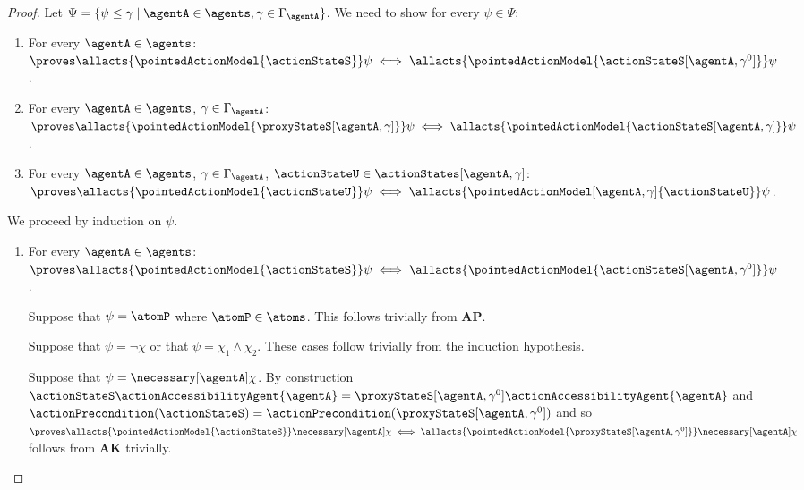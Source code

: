 \documentclass[twoside]{aiml14}
\begin{document}
\begin{proof}
      Let $\Psi = \{\psi \leq \gamma \mid \agentA \in \agents, \gamma \in \Gamma_\agentA\}$. We need to show for every $\psi \in \Psi$:

      \begin{enumerate}
          \item For every $\agentA \in \agents$: $\proves \allacts{\pointedActionModel{\actionStateS}} \psi \iff \allacts{\pointedActionModel{\actionStateS[\agentA,\gamma^0]}} \psi$.
          \item For every $\agentA \in \agents$, $\gamma \in \Gamma_\agentA$: $\proves \allacts{\pointedActionModel{\proxyStateS[\agentA,\gamma]}} \psi \iff \allacts{\pointedActionModel{\actionStateS[\agentA,\gamma]}} \psi$.
          \item For every $\agentA \in \agents$, $\gamma \in \Gamma_\agentA$, $\actionStateU \in \actionStates[\agentA,\gamma]$: $\proves \allacts{\pointedActionModel{\actionStateU}} \psi \iff \allacts{\pointedActionModel[\agentA,\gamma]{\actionStateU}} \psi$.
      \end{enumerate}

      We proceed by induction on $\psi$.

      \begin{enumerate}
          \item For every $\agentA \in \agents$: $\proves \allacts{\pointedActionModel{\actionStateS}} \psi \iff \allacts{\pointedActionModel{\actionStateS[\agentA,\gamma^0]}} \psi$.

              Suppose that $\psi = \atomP$ where $\atomP \in \atoms$. 
              This follows trivially from {\bf AP}.

              Suppose that $\psi = \neg \chi$ or that $\psi = \chi_1 \land \chi_2$. These cases follow trivially from the induction hypothesis.

              Suppose that $\psi = \necessary[\agentA] \chi$.
              By construction $\actionStateS \actionAccessibilityAgent{\agentA} = \proxyStateS[\agentA,\gamma^0] \actionAccessibilityAgent{\agentA}$ 
              and $\actionPrecondition(\actionStateS) = \actionPrecondition(\proxyStateS[\agentA,\gamma^0])$ 
              and so $\proves \allacts{\pointedActionModel{\actionStateS}} \necessary[\agentA] \chi \iff \allacts{\pointedActionModel{\proxyStateS[\agentA,\gamma^0]}} \necessary[\agentA] \chi$
              follows from {\bf AK} trivially.


\end{enumerate}
\end{proof}
\end{document}
